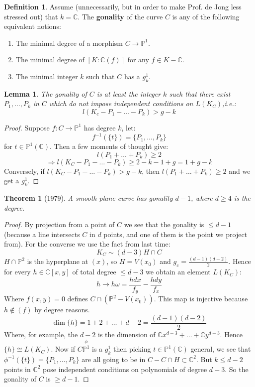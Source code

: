 \documentclass{article}
\newcommand{\C}{\mathbb{C}}
\newcommand{\Proj}{\mathbb{P}}
\theoremstyle{plain}
\newtheorem*{thm*}{Theorem}
\newtheorem*{lem*}{Lemma}
\theoremstyle{definition}
\newtheorem{defn}{Definition}
\theoremstyle{remark}
\begin{document}
\begin{defn}
Assume (unnecessarily, but in order to make Prof. de Jong less stressed out) that $k = \C$. The \textbf{gonality} of the curve $C$ is any of the following equivalent notions:
\begin{enumerate} [(1)]
\item The minimal degree of a morphism $C \to \Proj^1$.
\item The minimal degree of $[K:\C(f)]$ for any $f\in K - \C$.
\item The minimal integer $k$ such that $C$ has a $g^1_k$.
\end{enumerate}
\end{defn}
\begin{lem*}
The gonality of $C$ is at least the integer $k$ such that there exist $P_1, \dots, P_k$ in $C$ which do not impose independent conditions on $L(K_C)$,i.e.:
\[      l (K_c - P_1 - \dots - P_k) > g-k         \]
\end{lem*}
\begin{proof}
Suppose $f: C \to \Proj^1$ has degree $k$, let:
\[     f^{-1} (\{t\}) = \{ P_1, \dots, P_k \}    \]
for $t\in \Proj^1(\C)$. Then a few moments of thought give:
\[       l(P_1 + \dots + P_k) \geq 2     \]
\[       \Rightarrow l(K_C - P_1 - \dots - P_k) \geq 2 - k - 1 + g = 1 + g -k       \]
Conversely, if $l(K_C - P_1 - \dots - P_k) >  g -k$, then $l(P_1 + \dots + P_k) \geq 2$ and we get a $g_k^1$.
\end{proof}

\begin{thm*} [1979]
A smooth plane curve has gonality $d-1$, where $d\geq 4$ is the degree.
\end{thm*}
\begin{proof}
By projection from a point of $C$ we see that the gonality is $\leq d-1$ (because a line intersects $C$ in $d$ points, and one of them is the point we project from). For the converse we use the fact from last time:
\[       K_C \sim (d-3) H \cap C     \]
$H \cap \Proj^2$ is the hyperplane at $(x)$, so $H = V(x_0)$ and $g_c = \frac{(d-1)(d-2)}{2}$. Hence for every $h \in \C[x,y]$ of total degree $\leq d-3$ we obtain an element $L(K_C)$:
\[     h \to h\omega = \frac{h dx}{f_y} - \frac{h dy}{f_x}   \]
Where $f(x,y) = 0$ defines $C \cap (\Proj^2 - V(x_0))$. This map is injective because $h \not \in (f)$ by degree reasons.
\[      \dim \{h\} = 1 + 2 + \dots + d-2 = \frac{(d-1)(d-2)}{2}     \]
Where, for example, the $d-2$ is the dimension of $\C x^{d-3} + \dots + \C y^{d-3}$. Hence $\{h\} \cong L(K_C)$. Now if $C \overset{\phi}{\Proj^1}$ is a $g_k^1$ then picking $t \in \Proj^1 (\C)$ general, we see that $\phi^{-1} (\{t\}) = \{ P_1, \dots, P_k \} $ are all going to be in $C - C\cap H \subset \C^2$. But $k\leq d-2$ points in $\C^2$ pose independent conditions on polynomials of degree $d-3$. So the gonality of $C$ is $\geq d-1$.
\end{proof}
\end{document}
